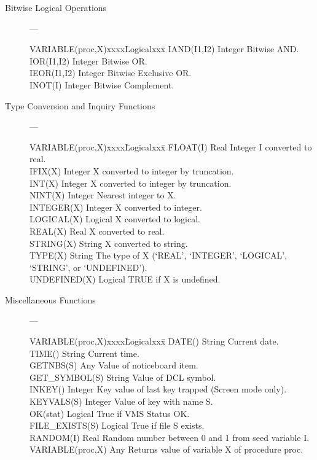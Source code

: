 \begin{description}
\item [Bitwise Logical Operations] ---

\begin{tabbing}
VARIABLE(proc,X)xxxx\=Logicalxxx\=\kill
IAND(I1,I2) \> Integer \> Bitwise AND. \\
IOR(I1,I2) \> Integer \> Bitwise OR. \\
IEOR(I1,I2) \> Integer \> Bitwise Exclusive OR. \\
INOT(I) \> Integer \> Bitwise Complement. \\
\end{tabbing}

\item [Type Conversion and Inquiry Functions] ---

\begin{tabbing}
VARIABLE(proc,X)xxxx\=Logicalxxx\=\kill
FLOAT(I) \> Real \> Integer I converted to real. \\
IFIX(X) \> Integer \> X converted to integer by truncation. \\
INT(X) \> Integer \> X converted to integer by truncation. \\
NINT(X) \> Integer \> Nearest integer to X. \\
INTEGER(X) \> Integer \> X converted to integer. \\
LOGICAL(X) \> Logical \> X converted to logical. \\
REAL(X) \> Real \> X converted to real.\\
STRING(X) \> String \> X converted to string. \\
TYPE(X) \> String \> The type of X (`REAL', `INTEGER', `LOGICAL', \\
 \> \>`STRING', or `UNDEFINED'). \\
UNDEFINED(X) \> Logical \> TRUE if X is undefined. \\
\end{tabbing}

\item [Miscellaneous Functions] ---

\begin{tabbing}
VARIABLE(proc,X)xxxx\=Logicalxxx\=\kill
DATE() \> String \> Current date. \\
TIME() \> String \> Current time. \\
GETNBS(S) \> Any \> Value of noticeboard item. \\
GET\_SYMBOL(S) \> String \> Value of DCL symbol. \\
INKEY() \> Integer \> Key value of last key trapped (Screen mode only). \\
KEYVALS(S) \> Integer \> Value of key with name S. \\
OK(stat) \> Logical \> True if VMS Status OK. \\
FILE\_EXISTS(S) \> Logical \> True if file S exists. \\
RANDOM(I) \> Real \> Random number between 0 and 1 from seed variable I. \\
VARIABLE(proc,X) \> Any \> Returns value of variable X of procedure proc.\\
\end{tabbing}
\end{description}

